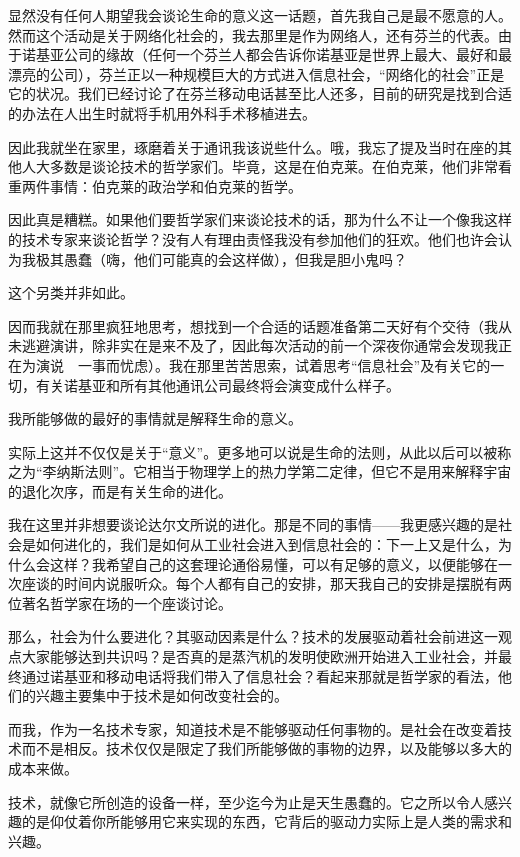 显然没有任何人期望我会谈论生命的意义这一话题，首先我自己是最不愿意的人。然而这个活动是关于网络化社会的，我去那里是作为网络人，还有芬兰的代表。由于诺基亚公司的缘故（任何一个芬兰人都会告诉你诺基亚是世界上最大、最好和最漂亮的公司），芬兰正以一种规模巨大的方式进入信息社会，“网络化的社会”正是它的状况。我们已经讨论了在芬兰移动电话甚至比人还多，目前的研究是找到合适的办法在人出生时就将手机用外科手术移植进去。

因此我就坐在家里，琢磨着关于通讯我该说些什么。哦，我忘了提及当时在座的其他人大多数是谈论技术的哲学家们。毕竟，这是在伯克莱。在伯克莱，他们非常看重两件事情：伯克莱的政治学和伯克莱的哲学。

因此真是糟糕。如果他们要哲学家们来谈论技术的话，那为什么不让一个像我这样的技术专家来谈论哲学？没有人有理由责怪我没有参加他们的狂欢。他们也许会认为我极其愚蠢（嗨，他们可能真的会这样做），但我是胆小鬼吗？

这个另类并非如此。

因而我就在那里疯狂地思考，想找到一个合适的话题准备第二天好有个交待（我从未逃避演讲，除非实在是来不及了，因此每次活动的前一个深夜你通常会发现我正在为演说　一事而忧虑）。我在那里苦苦思索，试着思考“信息社会”及有关它的一切，有关诺基亚和所有其他通讯公司最终将会演变成什么样子。

我所能够做的最好的事情就是解释生命的意义。

实际上这并不仅仅是关于“意义”。更多地可以说是生命的法则，从此以后可以被称之为“李纳斯法则”。它相当于物理学上的热力学第二定律，但它不是用来解释宇宙的退化次序，而是有关生命的进化。

我在这里并非想要谈论达尔文所说的进化。那是不同的事情——我更感兴趣的是社会是如何进化的，我们是如何从工业社会进入到信息社会的：下一上又是什么，为什么会这样？我希望自己的这套理论通俗易懂，可以有足够的意义，以便能够在一次座谈的时间内说服听众。每个人都有自己的安排，那天我自己的安排是摆脱有两位著名哲学家在场的一个座谈讨论。

那么，社会为什么要进化？其驱动因素是什么？技术的发展驱动着社会前进这一观点大家能够达到共识吗？是否真的是蒸汽机的发明使欧洲开始进入工业社会，并最终通过诺基亚和移动电话将我们带入了信息社会？看起来那就是哲学家的看法，他们的兴趣主要集中于技术是如何改变社会的。

而我，作为一名技术专家，知道技术是不能够驱动任何事物的。是社会在改变着技术而不是相反。技术仅仅是限定了我们所能够做的事物的边界，以及能够以多大的成本来做。

技术，就像它所创造的设备一样，至少迄今为止是天生愚蠢的。它之所以令人感兴趣的是仰仗着你所能够用它来实现的东西，它背后的驱动力实际上是人类的需求和兴趣。

